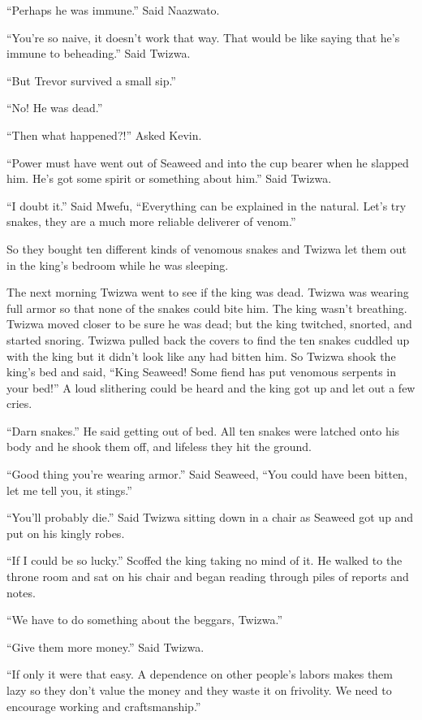 ``Perhaps he was immune.'' Said Naazwato.

``You're so naive, it doesn't work that way. That would be like saying that he's immune to beheading.'' Said Twizwa.

``But Trevor survived a small sip.''

``No! He was dead.''

``Then what happened?!'' Asked Kevin.

``Power must have went out of Seaweed and into the cup bearer when he slapped him. He's got some spirit or something about him.'' Said Twizwa.

``I doubt it.'' Said Mwefu, ``Everything can be explained in the natural. Let's try snakes, they are a much more reliable deliverer of venom.''

So they bought ten different kinds of venomous snakes and Twizwa let them out in the king's bedroom while he was sleeping.

The next morning Twizwa went to see if the king was dead.
Twizwa was wearing full armor so that none of the snakes could bite him.
The king wasn't breathing.
Twizwa moved closer to be sure he was dead; but the king twitched, snorted, and started snoring.
Twizwa pulled back the covers to find the ten snakes cuddled up with the king but it didn't look like any had bitten him.
So Twizwa shook the king's bed and said,
``King Seaweed! Some fiend has put venomous serpents in your bed!'' A loud slithering could be heard and the king got up and let out a few cries.

``Darn snakes.'' He said getting out of bed.
All ten snakes were latched onto his body and he shook them off, and lifeless they hit the ground.

``Good thing you're wearing armor.'' Said Seaweed, ``You could have been bitten, let me tell you, it stings.''

``You'll probably die.'' Said Twizwa sitting down in a chair as Seaweed got up and put on his kingly robes.

``If I could be so lucky.'' Scoffed the king taking no mind of it. He walked to the throne room and sat on his chair and began reading through piles of reports and notes.

``We have to do something about the beggars, Twizwa.''

``Give them more money.'' Said Twizwa.

``If only it were that easy. A dependence on other people's labors makes them lazy so they don't value the money and they waste it on frivolity. We need to encourage working and craftsmanship.''

